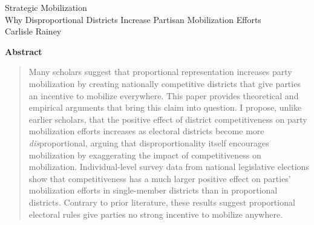 \documentclass[12pt]{article}
\begin{document}
\begin{center}
{\LARGE Strategic Mobilization}\\\vspace{2mm}
{\large Why Disproportional Districts Increase Partisan Mobilization Efforts}\\
\vspace{3mm}
Carlisle Rainey\\\singlespace
\end{center}


{\centerline{\textbf{Abstract}}}
\begin{quote}\noindent Many scholars suggest that proportional representation increases party mobilization by creating nationally competitive districts that give parties an incentive to mobilize everywhere. This paper provides theoretical and empirical arguments that bring this claim into question. I propose, unlike earlier scholars, that the positive effect of district competitiveness on party mobilization efforts increases as electoral districts become more \textit{dis}proportional, arguing that disproportionality itself encourages mobilization by exaggerating the impact of competitiveness on mobilization. Individual-level survey data from national legislative elections show that competitiveness has a much larger positive effect on parties' mobilization efforts in single-member districts than in proportional districts. Contrary to prior literature, these results suggest proportional electoral rules give parties no strong incentive to mobilize anywhere.\end{quote}
\thispagestyle{empty}


\newpage
\doublespace
\end{document}
